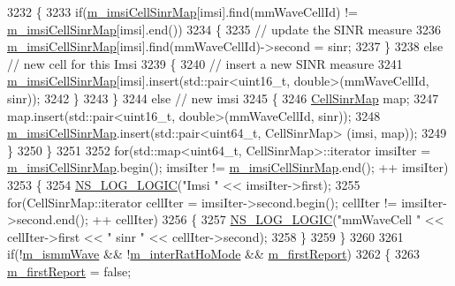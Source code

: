 \begin{DoxyCode}
3232     \{
3233       \textcolor{keywordflow}{if}(\hyperlink{classns3_1_1LteEnbRrc_a72b3ce5c1f8495e96bfc0f384ecf3a96}{m\_imsiCellSinrMap}[imsi].find(mmWaveCellId) != 
      \hyperlink{classns3_1_1LteEnbRrc_a72b3ce5c1f8495e96bfc0f384ecf3a96}{m\_imsiCellSinrMap}[imsi].end())
3234       \{
3235         \textcolor{comment}{// update the SINR measure}
3236         \hyperlink{classns3_1_1LteEnbRrc_a72b3ce5c1f8495e96bfc0f384ecf3a96}{m\_imsiCellSinrMap}[imsi].find(mmWaveCellId)->second = sinr;
3237       \}
3238       \textcolor{keywordflow}{else} \textcolor{comment}{// new cell for this Imsi}
3239       \{
3240         \textcolor{comment}{// insert a new SINR measure}
3241         \hyperlink{classns3_1_1LteEnbRrc_a72b3ce5c1f8495e96bfc0f384ecf3a96}{m\_imsiCellSinrMap}[imsi].insert(std::pair<uint16\_t, double>(mmWaveCellId, sinr));
3242       \}
3243     \}
3244     \textcolor{keywordflow}{else} \textcolor{comment}{// new imsi}
3245     \{
3246       \hyperlink{namespacens3_a1a41652a34d3ad5a6fb5d9a0f57e29f8}{CellSinrMap} map;
3247       map.insert(std::pair<uint16\_t, double>(mmWaveCellId, sinr));
3248       \hyperlink{classns3_1_1LteEnbRrc_a72b3ce5c1f8495e96bfc0f384ecf3a96}{m\_imsiCellSinrMap}.insert(std::pair<uint64\_t, CellSinrMap> (imsi, map));
3249         \}
3250         \}
3251   
3252         \textcolor{keywordflow}{for}(std::map<uint64\_t, CellSinrMap>::iterator imsiIter = 
      \hyperlink{classns3_1_1LteEnbRrc_a72b3ce5c1f8495e96bfc0f384ecf3a96}{m\_imsiCellSinrMap}.begin(); imsiIter != \hyperlink{classns3_1_1LteEnbRrc_a72b3ce5c1f8495e96bfc0f384ecf3a96}{m\_imsiCellSinrMap}.end(); ++
      imsiIter)
3253         \{
3254     \hyperlink{group__logging_ga88acd260151caf2db9c0fc84997f45ce}{NS\_LOG\_LOGIC}(\textcolor{stringliteral}{"Imsi "} << imsiIter->first);
3255     \textcolor{keywordflow}{for}(CellSinrMap::iterator cellIter = imsiIter->second.begin(); cellIter != imsiIter->second.end(); ++
      cellIter)
3256     \{
3257       \hyperlink{group__logging_ga88acd260151caf2db9c0fc84997f45ce}{NS\_LOG\_LOGIC}(\textcolor{stringliteral}{"mmWaveCell "} << cellIter->first << \textcolor{stringliteral}{" sinr "} <<  cellIter->second);
3258     \}
3259   \}
3260 
3261         \textcolor{keywordflow}{if}(!\hyperlink{classns3_1_1LteEnbRrc_a44515fc06d16f2b477afe0c05425e206}{m\_ismmWave} && !\hyperlink{classns3_1_1LteEnbRrc_a25849018e31a7766dfc839663e4c5ca4}{m\_interRatHoMode} && 
      \hyperlink{classns3_1_1LteEnbRrc_afa7c3d62a87abb384175401d9a64ed22}{m\_firstReport})
3262         \{
3263                 \hyperlink{classns3_1_1LteEnbRrc_afa7c3d62a87abb384175401d9a64ed22}{m\_firstReport} = \textcolor{keyword}{false};

\end{DoxyCode}
